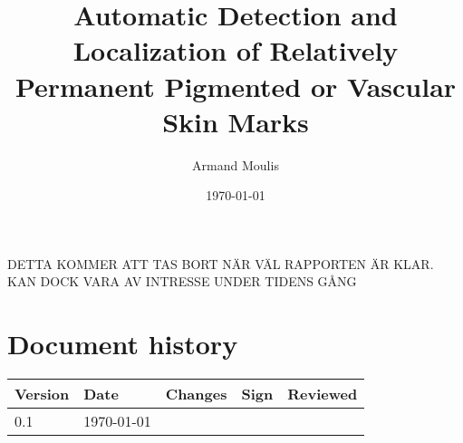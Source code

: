 \documentclass{article}
\begin{document}
	
	
\title{Automatic Detection and Localization of Relatively Permanent Pigmented or Vascular Skin Marks}
\author{Armand Moulis}
\date{\today}
\maketitle

\newpage

\listoffigures

\listoftables

\newpage

\setcounter{tocdepth}{3}
\tableofcontents

\newpage

DETTA KOMMER ATT TAS BORT NÄR VÄL RAPPORTEN ÄR KLAR. KAN DOCK VARA AV INTRESSE UNDER TIDENS GÅNG 
\section*{Document history}
\begin{center}
	\begin{tabular}{|l|l| p{5cm} |l|l| }
		\hline
		Version & Date   & Changes & Sign & Reviewed \\ \hline
		0.1     & \today &         &      &  \\ \hline
	\end{tabular}
\end{center}





\setcounter{page}{1}
\newpage
















	
\newpage

	
	
\end{document}
